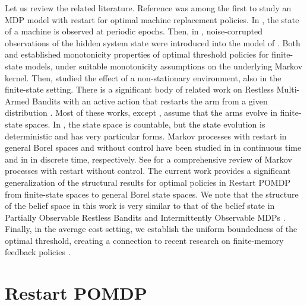 \documentclass[letterpaper,10pt,conference]{ieeeconf}  %
\begin{document}
Let us review the related literature. Reference \cite{D63} was among the first to study an MDP model with restart for optimal machine replacement policies. In \cite{D63}, the state of a machine is observed at periodic epochs. Then, in \cite{W79}, noise-corrupted observations of the hidden system state were introduced into the model of \cite{D63}. Both \cite{D63} and \cite{W79} established monotonicity properties of optimal threshold policies for finite-state models, under suitable monotonicity assumptions on the underlying Markov kernel. Then, \cite{KK10} studied the effect of a non-stationary environment, also in the finite-state setting. There is a significant body of related work on Restless Multi-Armed Bandits with an active action that restarts the arm from a given distribution \cite{AM22,AM24,AB16,H18,JS12,LWZ11,Metal20,TM24,V16}. Most of these works, except \cite{AB16,H18,TM24}, assume that the arms evolve in finite-state spaces. In \cite{AB16,H18,TM24}, the state space is countable, but the state evolution is deterministic and has very particular forms.
Markov processes with restart in general Borel spaces and without control have been studied in \cite{APZ13} in continuous time and in \cite{APZ18} in discrete time, respectively. See \cite{EMS20} for a comprehensive review of Markov processes with restart without control. The current work provides a significant generalization of the structural results for optimal policies in Restart POMDP from finite-state spaces to general Borel state spaces. We note that the structure of the belief space in this work is very similar to that of the belief state in Partially Observable Restless Bandits \cite{AM24} and Intermittently Observable MDPs \cite{CL25,ADK25}. Finally, in the average cost setting, we establish the uniform boundedness of the optimal threshold, creating a connection to recent research on finite-memory feedback policies \cite{KY22}.

\section{Restart POMDP}
\end{document}
